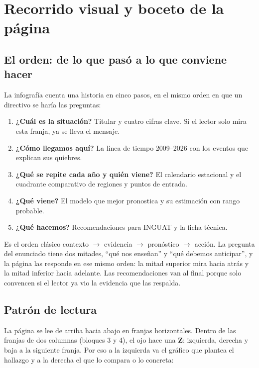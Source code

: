 \section{Recorrido visual y boceto de la página}
\label{sec:recorrido}

\subsection{El orden: de lo que pasó a lo que conviene hacer}

La infografía cuenta una historia en cinco pasos, en el mismo orden en que un
directivo se haría las preguntas:

\begin{enumerate}[leftmargin=*]
  \item \textbf{¿Cuál es la situación?} Titular y cuatro cifras clave. Si el
  lector solo mira esta franja, ya se lleva el mensaje.
  \item \textbf{¿Cómo llegamos aquí?} La línea de tiempo 2009--2026 con los
  eventos que explican sus quiebres.
  \item \textbf{¿Qué se repite cada año y quién viene?} El calendario
  estacional y el cuadrante comparativo de regiones y puntos de entrada.
  \item \textbf{¿Qué viene?} El modelo que mejor pronostica y su estimación
  con rango probable.
  \item \textbf{¿Qué hacemos?} Recomendaciones para INGUAT y la ficha técnica.
\end{enumerate}

Es el orden clásico contexto $\rightarrow$ evidencia $\rightarrow$ pronóstico
$\rightarrow$ acción. La pregunta del enunciado tiene dos mitades, ``qué nos
enseñan'' y ``qué debemos anticipar'', y la página las responde en ese mismo
orden: la mitad superior mira hacia atrás y la mitad inferior hacia adelante.
Las recomendaciones van al final porque solo convencen si el lector ya vio la
evidencia que las respalda.

\subsection{Patrón de lectura}

La página se lee de arriba hacia abajo en franjas horizontales. Dentro de las
franjas de dos columnas (bloques 3 y 4), el ojo hace una \textbf{Z}: izquierda,
derecha y baja a la siguiente franja. Por eso a la izquierda va el gráfico que
plantea el hallazgo y a la derecha el que lo compara o lo concreta:

